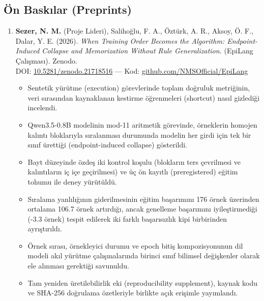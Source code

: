 \documentclass[11pt,a4paper]{article}
\begin{document}
\subsection*{Ön Baskılar (Preprints)}
\begin{enumerate}[leftmargin=*, itemsep=0.35em, topsep=2pt, start=4]
    \item \textbf{Sezer, N. M.} (Proje Lideri), Salihoğlu, F. A., Öztürk, A. R., Aksoy, Ö. F., Dalar, Y. E. (2026). \textit{When Training Order Becomes the Algorithm: Endpoint-Induced Collapse and Memorization Without Rule Generalization.} (EpiLang Çalışması). Zenodo. \\
    DOI: \href{https://doi.org/10.5281/zenodo.21718516}{10.5281/zenodo.21718516} --- Kod: \href{https://github.com/NMSOfficial/EpiLang}{github.com/NMSOfficial/EpiLang}
    \begin{itemize}
        \item Sentetik yürütme (execution) görevlerinde toplam doğruluk metriğinin, veri sırasından kaynaklanan kestirme öğrenmeleri (shortcut) nasıl gizlediği incelendi.
        \item Qwen3.5-0.8B modelinin mod-11 aritmetik görevinde, örneklerin homojen kalıntı bloklarıyla sıralanması durumunda modelin her girdi için tek bir sınıf ürettiği (endpoint-induced collapse) gösterildi.
        \item Bayt düzeyinde özdeş iki kontrol koşulu (blokların ters çevrilmesi ve kalıntıların iç içe geçirilmesi) ve üç ön kayıtlı (preregistered) eğitim tohumu ile deney yürütüldü.
        \item Sıralama yanlılığının giderilmesinin eğitim başarımını 176 örnek üzerinden ortalama 106.7 örnek artırdığı, ancak genelleme başarımını iyileştirmediği (-3.3 örnek) tespit edilerek iki farklı başarısızlık kipi birbirinden ayrıştırıldı.
        \item Örnek sırası, örnekleyici durumu ve epoch bitiş kompozisyonunun dil modeli akıl yürütme çalışmalarında birinci sınıf bilimsel değişkenler olarak ele alınması gerektiği savunuldu.
        \item Tam yeniden üretilebilirlik eki (reproducibility supplement), kaynak kodu ve SHA-256 doğrulama özetleriyle birlikte açık erişimle yayımlandı.
    \end{itemize}


\end{enumerate}
\end{document}
